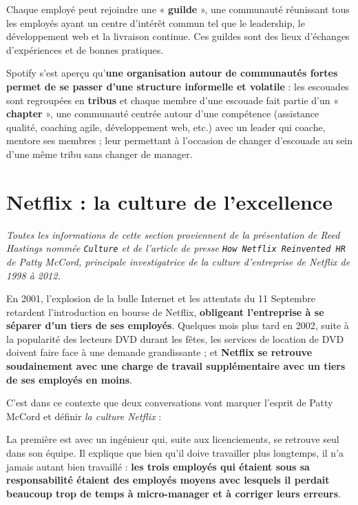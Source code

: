 Chaque employé peut rejoindre une « \textbf{guilde} », une communauté réunissant tous les employés ayant un centre d'intérêt commun tel que le leadership, le  développement web et la livraison continue. Ces guildes sont des lieux d'échanges d'expériences et de bonnes pratiques.

Spotify s'est aperçu qu'\textbf{une organisation autour de communautés fortes permet de se passer d'une structure informelle et volatile} : les escouades sont regroupées en \textbf{tribus} et chaque membre d'une escouade fait partie d'un « \textbf{chapter} », une communauté centrée autour d'une compétence (assistance qualité, coaching agile, développement web, etc.) avec un leader qui coache, mentore ses membres ; leur permettant à l'occasion de changer d'escouade au sein d'une même tribu sans changer de manager.

\section{Netflix : la culture de l'excellence }

\textit{Toutes les informations de cette section proviennent de la présentation de Reed Hastings nommée \texttt{Culture}\supercite{NetflixCultureBook} et de l'article de presse \texttt{How Netflix Reinvented HR}\supercite{NetflixReinventedHR} de Patty McCord, principale investigatrice de la culture d'entreprise de Netflix de 1998 à 2012.} 

\vspace{5mm}

En 2001, l'explosion de la bulle Internet et les attentats du 11 Septembre retardent l'introduction en bourse de Netflix, \textbf{obligeant l'entreprise à se séparer d'un tiers de ses employés}. Quelques mois plus tard en 2002, suite à la popularité des lecteurs DVD durant les fêtes, les services de location de DVD doivent faire face à une demande grandissante ; et \textbf{Netflix se retrouve soudainement avec une charge de travail supplémentaire avec un tiers de ses employés en moins}.

\vspace{5mm}

C'est dans ce contexte que deux conversations vont marquer l'esprit de Patty McCord et définir \textit{la culture Netflix} :

La première est avec un ingénieur qui, suite aux licenciements, se retrouve seul dans son équipe. Il explique que bien qu'il doive travailler plus longtemps, il n'a jamais autant bien travaillé : \textbf{les trois employés qui étaient sous sa responsabilité étaient des employés moyens avec lesquels il perdait beaucoup trop de temps à micro-manager et à corriger leurs erreurs}.

